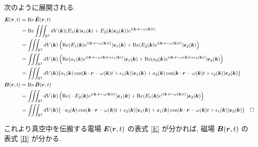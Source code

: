 \documentclass[uplatex,a4paper,dvipdfmx]{jsarticle}
\theoremstyle{definition}
\begin{document}
次のように展開される.
\begin{align}
  \EE(\rr, t) & = \Re\tilde{\EE}(\rr, t)                                                                                                                                                                                          \\
              & = \Re\iiint_{\RR^3} dV(\kk)(E_1(\kk)\ee_1(\kk) + E_2(\kk)\ee_2(\kk))e^{\ii(\kk\vdot\rr - \omega(\kk)t)}                                                                                                           \\
              & = \iiint_{\RR^3} dV(\kk)\left(\Re(E_1(\kk)e^{\ii(\kk\cdot\rr - \omega(\kk)t)})\ee_1(\kk) + \Re(E_2(\kk)e^{\ii(\kk\cdot\rr - \omega(\kk)t)})\ee_2(\kk)\right)                                                      \\
              & = \iiint_{\RR^3} dV(\kk)\left(\Re(a_1(\kk)e^{\ii(\kk\cdot\rr - \omega(\kk)t + \epsilon_1(\kk))})\ee_1(\kk) + \Re(a_2(\kk)e^{\ii(\kk\cdot\rr - \omega(\kk)t + \epsilon_2(\kk))})\ee_2(\kk)\right)                  \\
              & = \iiint_{\RR^3} dV(\kk)\lbrace a_1(\kk)\cos(\kk\cdot\rr - \omega(\kk)t + \epsilon_1(\kk))\ee_1(\kk) + a_2(\kk)\cos(\kk\cdot\rr - \omega(\kk)t + \epsilon_2(\kk))\ee_2(\kk)\rbrace \label{E}                      \\
  \BB(\rr, t) & = \Re\tilde{\BB}(\rr, t)                                                                                                                                                                                          \\
              & = \iiint_{\RR^3} dV(\kk)\left(\Re(-E_2(\kk)e^{\ii(\kk\cdot\rr - \omega(\kk)t)})\ee_1(\kk) + \Re(E_1(\kk)e^{i(\kk\cdot\rr - \omega(\kk)t)})\ee_2(\kk)\right)                                                       \\
              & = \iiint_{\RR^3} dV(\kk)\lbrace -a_2(\kk)\cos(\kk\cdot\rr - \omega(\kk)t + \epsilon_2(\kk))\ee_1(\kk) + a_1(\kk)\cos(\kk\cdot\rr - \omega(\kk)t + \epsilon_1(\kk))\ee_2(\kk)\rbrace              & \Box \label{B}
\end{align}

これより真空中を伝搬する電場 $\vb*{E}(\vb*{r}, t)$ の表式 \eqref{E} が分かれば, 磁場 $\vb*{B}(\vb*{r}, t)$ の表式 \eqref{B} が分かる. \\
\end{document}
